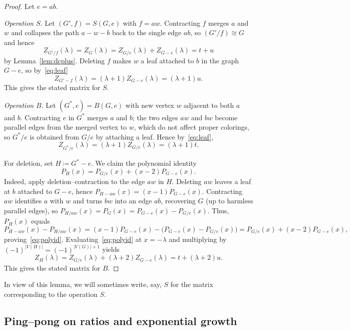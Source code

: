 \documentclass[A4paper,reqno,oneside,12pt]{amsart}
\theoremstyle{plain}
\theoremstyle{definition}
\begin{document}
\begin{proof}
Let $e=ab$.

\smallskip\noindent\emph{Operation $S$.}
Let $(G',f)=S(G,e)$ with $f=aw$.
Contracting $f$ merges $a$ and $w$ and collapses the path $a\!-\!w\!-\!b$ back to the single edge $ab$, so $(G'/f)\cong G$ and hence
\[
Z_{G'/f}(\lambda)=Z_G(\lambda)=Z_{G/e}(\lambda)+Z_{G-e}(\lambda)=t+u
\]
by Lemma~\ref{lem:dcplus}.
Deleting $f$ makes $w$ a leaf attached to $b$ in the graph $G-e$, so by~\eqref{eq:leaf}
\[
Z_{G'-f}(\lambda)=(\lambda+1)Z_{G-e}(\lambda)=(\lambda+1)u.
\]
This gives the stated matrix for $S$.

\smallskip\noindent\emph{Operation $B$.}
Let $(G^\ast,e)=B(G,e)$ with new vertex $w$ adjacent to both $a$ and $b$.
Contracting $e$ in $G^\ast$ merges $a$ and $b$; the two edges $aw$ and $bw$ become parallel edges from the merged vertex to $w$, which do not affect proper colorings, so $G^\ast/e$ is obtained from $G/e$ by attaching a leaf. Hence by~\eqref{eq:leaf},
\[
Z_{G^\ast/e}(\lambda)=(\lambda+1)Z_{G/e}(\lambda)=(\lambda+1)t.
\]

For deletion, set $H\coloneqq G^\ast-e$.  We claim the polynomial identity
\begin{equation}\label{eq:polyid}
P_H(x)=P_{G/e}(x)+(x-2)P_{G-e}(x).
\end{equation}
Indeed, apply deletion--contraction to the edge $aw$ in $H$.
Deleting $aw$ leaves a leaf at $b$ attached to $G-e$, hence $P_{H-aw}(x)=(x-1)P_{G-e}(x)$.
Contracting $aw$ identifies $a$ with $w$ and turns $bw$ into an edge $ab$, recovering $G$ (up to harmless parallel edges),
so $P_{H/aw}(x)=P_G(x)=P_{G-e}(x)-P_{G/e}(x)$.
Thus, $P_H(x)$ equals
\[
P_{H-aw}(x)-P_{H/aw}(x)
=
(x-1)P_{G-e}(x)-\bigl(P_{G-e}(x)-P_{G/e}(x)\bigr)
=
P_{G/e}(x)+(x-2)P_{G-e}(x),
\]
proving~\eqref{eq:polyid}.
Evaluating~\eqref{eq:polyid} at $x=-\lambda$ and multiplying by $(-1)^{|V(H)|}=(-1)^{|V(G)|+1}$ yields
\[
Z_H(\lambda)=Z_{G/e}(\lambda)+(\lambda+2)Z_{G-e}(\lambda)=t+(\lambda+2)u.
\]
This gives the stated matrix for $B$.
\end{proof}

In view of this lemma, we will sometimes write, say, $S$ for the matrix corresponding to the operation $S$. 

\subsection{Ping--pong on ratios and exponential growth}
\end{document}
